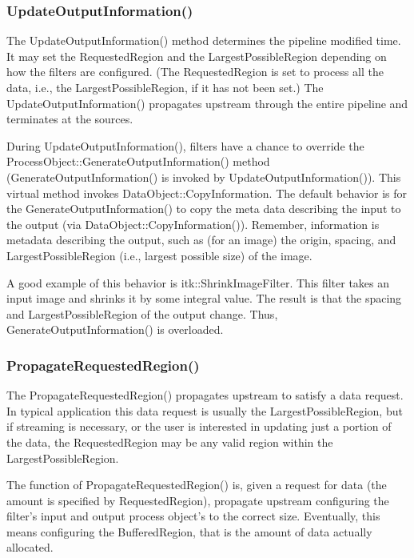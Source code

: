 \subsubsection{UpdateOutputInformation()}
\label{sec:UpdateOutputInformation}

The UpdateOutputInformation() method determines the pipeline modified
time. It may set the RequestedRegion and the LargestPossibleRegion depending
on how the filters are configured. (The RequestedRegion is set to process all
the data, i.e., the LargestPossibleRegion, if it has not been set.) The
UpdateOutputInformation() propagates upstream through the entire pipeline and
terminates at the sources.

During UpdateOutputInformation(), filters have a chance to override the
ProcessObject::GenerateOutputInformation() method
(GenerateOutputInformation() is invoked by UpdateOutputInformation()). This
virtual method invokes DataObject::CopyInformation. The default behavior is
for the GenerateOutputInformation() to copy the meta data describing the
input to the output (via DataObject::CopyInformation()). Remember,
information is metadata describing the output, such as (for an image) the
origin, spacing, and LargestPossibleRegion (i.e., largest possible size) of
the image.

A good example of this behavior is itk::ShrinkImageFilter. This filter takes
an input image and shrinks it by some integral value. The result is that the
spacing and LargestPossibleRegion of the output change. Thus,
GenerateOutputInformation() is overloaded.

\subsubsection{PropagateRequestedRegion()}
\label{sec:PropagateRequestedRegion}

The PropagateRequestedRegion() propagates upstream to satisfy a data
request. In typical application this data request is usually the
LargestPossibleRegion, but if streaming is necessary, or the user is
interested in updating just a portion of the data, the RequestedRegion may be
any valid region within the LargestPossibleRegion.

The function of PropagateRequestedRegion() is, given a request for data (the
amount is specified by RequestedRegion), propagate upstream configuring the
filter's input and output process object's to the correct size. Eventually,
this means configuring the BufferedRegion, that is the amount of data
actually allocated.

